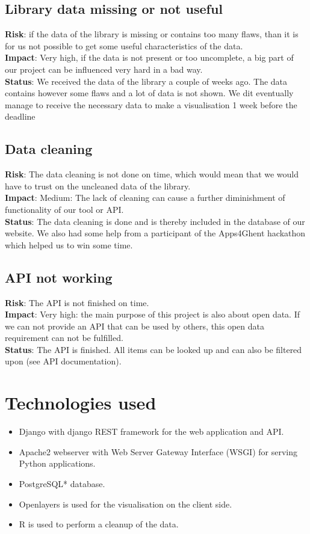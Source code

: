   \subsection{Library data missing or not useful}
	{\bf Risk}: if the data of the library is missing or contains too many flaws, than it is for us not possible to get some useful characteristics of the data.\\
	{\bf Impact}: Very high, if the data is not present or too uncomplete, a big part of our project can be influenced very hard in a bad way.\\
	{\bf Status}: We received the data of the library a couple of weeks ago. The data contains however some flaws and a lot of data is not shown. We dit eventually manage to receive the necessary data to make a visualisation 1 week before the deadline
  \subsection{Data cleaning}
	{\bf Risk}: The data cleaning is not done on time, which would mean that we would have to trust on the uncleaned data of the library.\\
	{\bf Impact}: Medium: The lack of cleaning can cause a further diminishment of functionality of our tool or API.\\
	{\bf Status}: The data cleaning is done and is thereby included in the database of our website. We also had some help from a participant of the Apps4Ghent hackathon which helped us to win some time.
  \subsection{API not working}
	{\bf Risk}: The API is not finished on time.\\
	{\bf Impact}: Very high: the main purpose of this project is also about open data. If we can not provide an API that can be used by others, this open data requirement can not be fulfilled.\\
	{\bf Status}: The API is finished. All items can be looked up and can also be filtered upon (see API documentation).
\newpage
\section{Technologies used}

\begin{itemize}
	\item Django with django REST framework for the web application and API.
	\item Apache2 webserver with Web Server Gateway Interface (WSGI) for serving Python applications.
  \item PostgreSQL* database.
  \item Openlayers is used for the visualisation on the client side. \cite{openlayers}
  \item R is used to perform a cleanup of the data.
\end{itemize}

